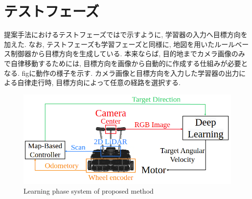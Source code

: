 
\section{テストフェーズ}
提案手法におけるテストフェーズではで示すように, 学習器の入力へ目標方向を加えた. なお, テストフェーズも学習フェーズと同様に, 地図を用いたルールベース制御器から目標方向を生成している. 本来ならば, 目的地までカメラ画像のみで自律移動するためには, 目標方向を画像から自動的に作成する仕組みが必要となる. figに動作の様子を示す. カメラ画像と目標方向を入力した学習器の出力による自律走行時, 目標方向によって任意の経路を選択する.

\begin{figure}[hbtp]
  \centering
 \includegraphics[keepaspectratio, scale=0.45]
      {images/suggest_test_phase.png}
 \caption{Learning phase system of proposed method}
 \label{Fig:suggest_test_phase}
\end{figure}

\newpage
